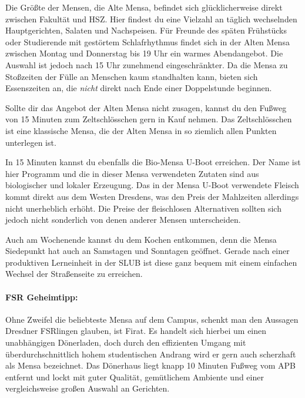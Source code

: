 Die Größte der Mensen, die Alte Mensa, befindet sich glücklicherweise direkt zwischen Fakultät und HSZ\@.
Hier findest du eine Vielzahl an täglich wechselnden Hauptgerichten, Salaten und Nachspeisen.
Für Freunde des späten Frühstücks oder Studierende mit gestörtem Schlafrhythmus findet sich in der Alten Mensa zwischen Montag und Donnerstag bis 19 Uhr ein warmes Abendangebot.
Die Auswahl ist jedoch nach 15 Uhr zunehmend eingeschränkter.
Da die Mensa zu Stoßzeiten der Fülle an Menschen kaum standhalten kann, bieten sich Essenszeiten an, die \emph{nicht} direkt nach Ende einer Doppelstunde beginnen.

Sollte dir das Angebot der Alten Mensa nicht zusagen, kannst du den Fußweg von 15 Minuten zum Zeltschlösschen gern in Kauf nehmen. Das Zeltschlösschen ist eine klassische Mensa, die der Alten Mensa in so ziemlich allen Punkten unterlegen ist.

In 15 Minuten kannst du ebenfalls die Bio-Mensa U-Boot erreichen. Der Name ist hier Programm und die in dieser Mensa verwendeten Zutaten sind aus biologischer und lokaler Erzeugung.
Das in der Mensa U-Boot verwendete Fleisch kommt direkt aus dem Westen Dresdens, was den Preis der Mahlzeiten allerdings nicht unerheblich erhöht.
Die Preise der fleischlosen Alternativen sollten sich jedoch nicht sonderlich von denen anderer Mensen unterscheiden.

Auch am Wochenende kannst du dem Kochen entkommen, denn die Mensa Siedepunkt hat auch an Samstagen und Sonntagen geöffnet.
Gerade nach einer produktiven Lerneinheit in der SLUB ist diese ganz bequem mit einem einfachen Wechsel der Straßenseite zu erreichen.

\paragraph{FSR Geheimtipp:}
Ohne Zweifel die beliebteste Mensa auf dem Campus, schenkt man den Aussagen Dresdner FSRlingen glauben, ist Firat.
Es handelt sich hierbei um einen unabhängigen Dönerladen, doch durch den effizienten Umgang mit überdurchschnittlich hohem studentischen Andrang wird er gern auch scherzhaft als Mensa bezeichnet.
Das Dönerhaus liegt knapp 10 Minuten Fußweg vom APB entfernt und lockt mit guter Qualität, gemütlichem Ambiente und einer vergleichsweise großen Auswahl an Gerichten.



